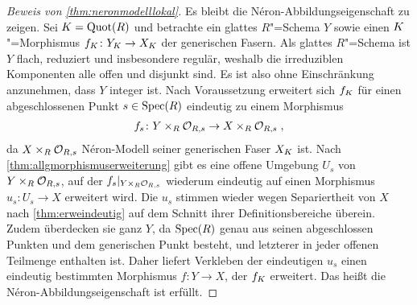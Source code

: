 \begin{proof}[Beweis von \ref{thm:neronmodelllokal}]
  Es bleibt die Néron-Abbildungseigenschaft zu zeigen.
  Sei ${K=\operatorname{Quot}(R)}$ und betrachte ein glattes $R$"=Schema $Y$ sowie
  einen $K$"=Morphismus ${f_{K}\colon Y_{K}\to X_{K}}$ der
  generischen Fasern.
  Als glattes $R$"=Schema ist $Y$ flach, reduziert und insbesondere
  regulär, weshalb die irreduziblen Komponenten alle offen und
  disjunkt sind. Es ist also ohne Einschränkung anzunehmen, dass
  $Y$ integer ist.
  Nach Voraussetzung erweitert sich $f_{K}$ für einen abgeschlossenen
  Punkt $s\in\operatorname{Spec}(R)$ eindeutig zu einem Morphismus
  \begin{gather*}
    f_s\colon Y\times_R\mathcal{O}_{R,s}\to X\times_R\mathcal{O}_{R,s}\;,
  \end{gather*}
  da $X\times_R\mathcal{O}_{R,s}$ Néron-Modell seiner generischen Faser $X_{K}$
  ist.
  Nach \ref{thm:allgmorphismuserweiterung} gibt es eine offene
  Umgebung $U_s$ von $Y\times_R\mathcal{O}_{R,s}$, auf der
  $f_s|_{Y\times_R\mathcal{O}_{R,s}}$ wiederum
  eindeutig auf einen Morphismus $u_s\colon U_s\to X$ erweitert
  wird.
  Die $u_s$ stimmen wieder wegen Separiertheit von $X$
  nach \ref{thm:erweindeutig} auf dem Schnitt ihrer
  Definitionsbereiche überein. Zudem überdecken sie ganz $Y$,
  da $\operatorname{Spec}(R)$ genau aus seinen abgeschlossen Punkten und dem
  generischen Punkt besteht, und letzterer in jeder offenen Teilmenge
  enthalten ist. 
  Daher liefert Verkleben der eindeutigen $u_s$ einen
  eindeutig bestimmten Morphismus $f\colon Y\to X$, der
  $f_{K}$ erweitert.
  Das heißt die Néron-Abbildungseigenschaft ist erfüllt.
\end{proof}


